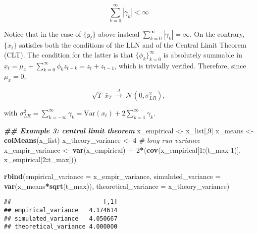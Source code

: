 \documentclass[
]{book}
\newenvironment{Shaded}{\begin{snugshade}}{\end{snugshade}}
\newcommand{\AttributeTok}[1]{\textcolor[rgb]{0.13,0.29,0.53}{#1}}
\newcommand{\CommentTok}[1]{\textcolor[rgb]{0.56,0.35,0.01}{\textit{#1}}}
\newcommand{\DecValTok}[1]{\textcolor[rgb]{0.00,0.00,0.81}{#1}}
\newcommand{\DocumentationTok}[1]{\textcolor[rgb]{0.56,0.35,0.01}{\textbf{\textit{#1}}}}
\newcommand{\FunctionTok}[1]{\textcolor[rgb]{0.13,0.29,0.53}{\textbf{#1}}}
\newcommand{\NormalTok}[1]{#1}
\newcommand{\OtherTok}[1]{\textcolor[rgb]{0.56,0.35,0.01}{#1}}
\newcommand{\SpecialCharTok}[1]{\textcolor[rgb]{0.81,0.36,0.00}{\textbf{#1}}}
\begin{document}
\[
\sum_{k=0}^\infty |\gamma_k| < \infty
\]

Notice that in the case of \(\{y_t\}\) above instead \(\sum_{k=0}^\infty |\gamma_k| = \infty\). On the contrary, \(\{x_t\}\) satisfies both the conditions of the LLN and of the Central Limit Theorem (CLT). The condition for the latter is that \(\{\phi_k\}_{k=0}^\infty\) is absolutely summable in \(x_t = \mu_x + \sum_{k=0}^\infty\phi_k z_{t-k} = z_t + z_{t-1}\), which is trivially verified. Therefore, since \(\mu_x = 0\),

\[
\sqrt{T} \ \bar{x}_T  \ \xrightarrow{d} \ \mathcal{N}(0, \sigma^2_{LR}),
\]

with \(\sigma^2_{LR} = \sum_{k=-\infty}^\infty \gamma_k = \text{Var}(x_t) + 2\sum_{k=1}^\infty \gamma_k\).

\begin{Shaded}
\begin{Highlighting}[]
\DocumentationTok{\#\# Example 3: central limit theorem}
\NormalTok{x\_empirical }\OtherTok{\textless{}{-}}\NormalTok{ x\_list[,}\DecValTok{9}\NormalTok{]}
\NormalTok{x\_means }\OtherTok{\textless{}{-}} \FunctionTok{colMeans}\NormalTok{(x\_list)}
\NormalTok{x\_theory\_variance }\OtherTok{\textless{}{-}} \DecValTok{4}  \CommentTok{\# long run variance}
\NormalTok{x\_empir\_variance }\OtherTok{\textless{}{-}} \FunctionTok{var}\NormalTok{(x\_empirical) }\SpecialCharTok{+} \DecValTok{2}\SpecialCharTok{*}\NormalTok{(}\FunctionTok{cov}\NormalTok{(x\_empirical[}\DecValTok{1}\SpecialCharTok{:}\NormalTok{(t\_max}\DecValTok{{-}1}\NormalTok{)], x\_empirical[}\DecValTok{2}\SpecialCharTok{:}\NormalTok{t\_max]))}

\FunctionTok{rbind}\NormalTok{(}\AttributeTok{empirical\_variance =}\NormalTok{ x\_empir\_variance,}
      \AttributeTok{simulated\_variance =} \FunctionTok{var}\NormalTok{(x\_means}\SpecialCharTok{*}\FunctionTok{sqrt}\NormalTok{(t\_max)),}
      \AttributeTok{theoretical\_variance =}\NormalTok{ x\_theory\_variance)}
\end{Highlighting}
\end{Shaded}

\begin{verbatim}
##                          [,1]
## empirical_variance   4.174614
## simulated_variance   4.050667
## theoretical_variance 4.000000
\end{verbatim}
\end{document}

